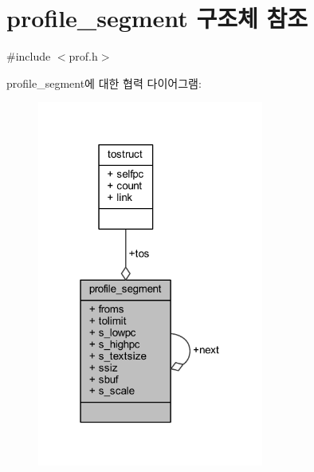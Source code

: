 \hypertarget{structprofile__segment}{}\section{profile\+\_\+segment 구조체 참조}
\label{structprofile__segment}


{\ttfamily \#include $<$prof.\+h$>$}



profile\+\_\+segment에 대한 협력 다이어그램\+:\nopagebreak
\begin{figure}[H]
\begin{center}
\leavevmode
\includegraphics[width=211pt]{structprofile__segment__coll__graph}
\end{center}
\end{figure}
